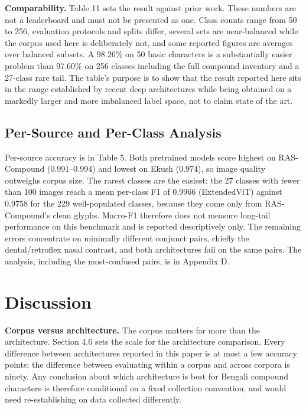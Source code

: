 \textbf{Comparability.} Table 11 sets the result against prior work. These numbers are not a leaderboard and must not be presented as one. Class counts range from 50 to 256, evaluation protocols and splits
differ, several sets are near-balanced while the corpus used here is deliberately not,
and some reported figures are averages over balanced subsets. A 98.26\%
on 50 basic characters \citep{ref17} is a substantially easier problem than
97.60\% on 256 classes including the full compound inventory and a
27-class rare tail. The table's purpose is to show that the result reported here sits
in the range established by recent deep architectures while being
obtained on a markedly larger and more imbalanced label space, not to
claim state of the art.

\hypertarget{per-source-and-per-class-analysis}{%
\subsection{Per-Source and Per-Class
Analysis}\label{per-source-and-per-class-analysis}}

Per-source accuracy is in Table 5. Both pretrained models score highest on RAS-Compound (0.991--0.994) and lowest on Ekush (0.974), so image quality outweighs corpus size. The rarest classes are the easiest: the 27 classes with fewer than 100 images reach a mean per-class F1 of 0.9966 (ExtendedViT) against 0.9758 for the 229 well-populated classes, because they come only from RAS-Compound's clean glyphs. Macro-F1 therefore does not measure long-tail performance on this benchmark and is reported descriptively only. The remaining errors concentrate on minimally different conjunct pairs, chiefly the dental/retroflex nasal contrast, and both architectures fail on the same pairs. The analysis, including the most-confused pairs, is in Appendix D.


\hypertarget{discussion}{%
\section{Discussion}\label{discussion}}

\textbf{Corpus versus architecture.} The corpus matters far more than the architecture.
Section 4.6 sets the scale for the architecture comparison. Every
difference between architectures reported in this paper is at most a few
accuracy points; the difference between evaluating within a corpus and
across corpora is ninety. Any conclusion about which architecture is
best for Bengali compound characters is therefore conditional on a fixed
collection convention, and would need re-establishing on data collected
differently.

